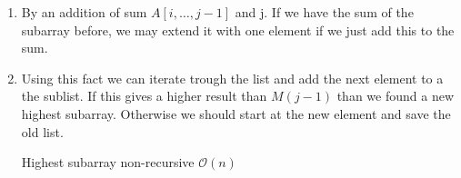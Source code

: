 \documentclass{article}
\newcommand{\bigO}{\mathcal{O}}
\begin{document}
\begin{enumerate}[label= \alph* )]
\begin{algorithm}[h]
      \caption{Highest subarray $\bigO (n^3)$} \label{Alg:A3}
  \end{algorithm}
  \item By an addition of sum $A[i, \dots , j - 1]$ and j. If we have the sum of the subarray before, we may extend it with one element if we just add this to the sum.
  \item Using this fact we can iterate trough the list and add the next element to a the sublist. If this gives a higher result than $M(j - 1)$ than we found a new highest subarray. Otherwise we should start at the new element and save the old list.
  \begin{algorithm}[h]
    \DontPrintSemicolon
    \Proc{\findHighestSubArray{A}}{
        $highestSum \leftarrow 0$ \;
        $highestArray \leftarrow nil$ \;
        $currentSubArray \leftarrow nil$ \;
        \For{i = 1 \KwTo n}{
          $currentSubArray.add(i)$ \;
          \If{$highestSum < highestSum + A[i]$}{
            $highestSum \leftarrow highestSum + A[i]$ \;
            $highestArray \leftarrow currentSubArray$ \;
          } \Else {
            $currentSubArray \leftarrow nil$ \;
          }
        }
        \KwRet{$highestArray[1] \& highestArray[highestArray.length]]$}

    }

      \caption{Highest subarray non-recursive $\bigO (n)$} \label{Alg:A4}
  \end{algorithm}
\end{enumerate}
\end{document}
